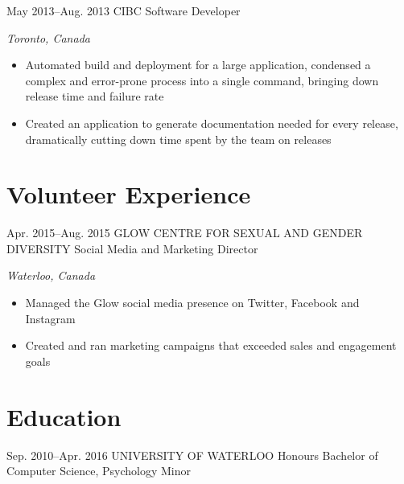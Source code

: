 \documentclass{friggeri-cv}
\begin{document}
\begin{sectionlist}
	\entry
	{May 2013--Aug. 2013}
	{CIBC}
	{Software Developer}
	{\emph {Toronto, Canada} \\
		\begin{itemize}
			\item Automated build and deployment for a large application, condensed a complex and error-prone process into a single command, bringing down release time and failure rate
			\item Created an application to generate documentation needed for every release,\\dramatically cutting down time spent by the team on releases
		\end{itemize}
	}
	
\end{sectionlist}



\vspace{-2.5\parskip}
\section{Volunteer Experience}


\begin{sectionlist}
	
	\entry
	{Apr. 2015--Aug. 2015}
	{GLOW CENTRE FOR SEXUAL AND GENDER DIVERSITY}
	{Social Media and Marketing Director}
	{\emph{Waterloo, Canada} \\
		\begin{itemize}
			\item Managed the Glow social media presence on Twitter, Facebook and Instagram
			\item Created and ran marketing campaigns that exceeded sales and engagement goals  
		\end{itemize}
	}

\end{sectionlist}

\vspace{-2.5\parskip}
\section{Education}

\begin{sectionlist}
		
	\education
	{Sep. 2010--Apr. 2016}
	{UNIVERSITY OF WATERLOO}
	{Honours Bachelor of Computer Science, Psychology Minor}
	
\end{sectionlist}
\end{document}

